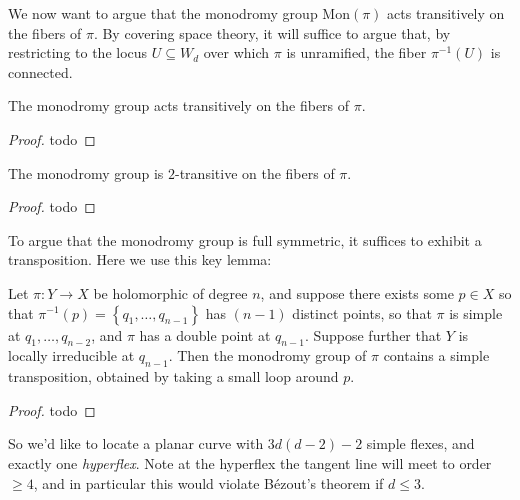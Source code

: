 \documentclass[11pt]{amsart}
\providecommand{\Mon}{\mathrm{Mon}}
\begin{document}
We now want to argue that the monodromy group $\Mon(\pi)$ acts transitively on the fibers of $\pi$. By covering space theory, it will suffice to argue that, by restricting to the locus $U \subseteq W_d$ over which $\pi$ is unramified, the fiber $\pi^{-1}(U)$ is connected.

\begin{proposition}\label{prop:monodromy-flexes-transitive} 
The monodromy group acts transitively on the fibers of $\pi$.
\end{proposition}
\begin{proof} todo
\end{proof}


\begin{proposition} The monodromy group is $2$-transitive on the fibers of $\pi$.
\end{proposition}
\begin{proof} todo
\end{proof}


To argue that the monodromy group is full symmetric, it suffices to exhibit a transposition. Here we use this key lemma:

\begin{lemma} Let $\pi \colon Y \to X$ be holomorphic of degree $n$, and suppose there exists some $p\in X$ so that $\pi^{-1}(p) = \left\{ q_1, \ldots, q_{n-1} \right\}$ has $(n-1)$ distinct points, so that $\pi$ is simple at $q_1, \ldots, q_{n-2}$, and $\pi$ has a double point at $q_{n-1}$. Suppose further that $Y$ is locally irreducible at $q_{n-1}$. Then the monodromy group of $\pi$ contains a simple transposition, obtained by taking a small loop around $p$.
\end{lemma}
\begin{proof} todo
\end{proof}


So we'd like to locate a planar curve with $3d(d-2) - 2$ simple flexes, and exactly one \textit{hyperflex}. Note at the hyperflex the tangent line will meet to order $\ge 4$, and in particular this would violate B\'{e}zout's theorem if $d \le 3$.
\end{document}
